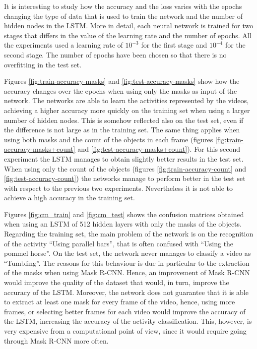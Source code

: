 \documentclass[12pt]{article}
\numberwithin{equation}{section} %
\numberwithin{figure}{section} %
\numberwithin{table}{section} %
\theoremstyle{definition}
\begin{document}
It is interesting to study how the accuracy and the loss varies
with the epochs changing the type of data that is used to
train the network and the number of hidden nodes in the 
LSTM. More in detail, each neural network is trained
for two stages that differs in the value of the learning
rate and the number of epochs. All the experiments used
a learning rate of $10^{-3}$ for the first stage and $10^{-4}$
for the second stage. The number of epochs have been chosen
so that there is no overfitting in the test set.

Figures \ref{fig:train-accuracy-masks} and
\ref{fig:test-accuracy-masks} show how the accuracy changes 
over the epochs when using only the masks as input of the
network. The networks are able to learn the activities
represented by the videos, achieving a higher accuracy
more quickly on the training set when using a larger number of
hidden nodes. This is somehow reflected also on the test
set, even if the difference is not large as in the training
set. The same thing
applies when using both masks and the count of the objects
in each frame (figures \ref{fig:train-accuracy-masks+count} and
\ref{fig:test-accuracy-masks+count}).
For this second experiment the LSTM manages
to obtain slightly better results in the test set.
When using only the count of the objects (figures
\ref{fig:train-accuracy-count} and
\ref{fig:test-accuracy-count}) the networks manage to perform
better in the test set with respect to the previous two
experiments. Nevertheless it is not able to achieve a high
accuracy in the training set.

Figures \ref{fig:cm_train} and \ref{fig:cm_test} shows 
the confusion matrices obtained when using an LSTM of 512
hidden layers with only the masks of the objects.
Regarding the training set, the main problem of the network
is on the recognition of the activity ``Using parallel
bars'', that is often confused with ``Using the pommel
horse''. On the test set, the network never manages to
classify a video as ``Tumbling''. The reasons for this
behaviour is due in particular to the extraction of the
masks when using Mask R-CNN. Hence, an improvement of
Mask R-CNN would improve the quality of the dataset that would,
in turn, improve the accuracy of the LSTM. Moreover, the
network does not guarantee that it is able to extract
at least one mask for every frame of the video, hence, using
more frames, or selecting better frames for each video would
improve the accuracy of the LSTM, increasing the accuracy of
the activity classification.
This, however, is very expensive from a
computational point of view, since it would require going
through Mask R-CNN more often.
\end{document}

